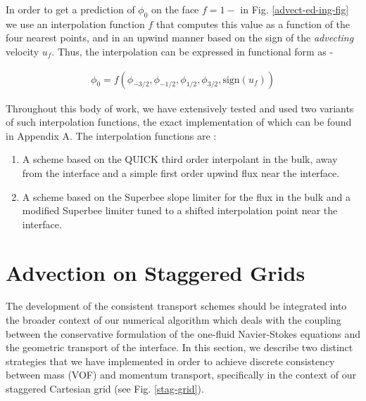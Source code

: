 In order to get a prediction of $\phi_0$ on the 
face $f=1-$ in Fig. \ref{advect-ed-ing-fig}
we use an interpolation function $f$ that computes 
this value as a function of the four nearest points,
and in an upwind manner based on the sign of the 
\textit{advecting} velocity $u_f$. Thus, the interpolation
can be expressed in functional form as - 


\begin{align}
\phi_0 = f \left( \phi_{-3/2}, \phi_{-1/2}, \phi_{1/2},\phi_{3/2},\textrm{sign}(u_f) \right)
\label{simpleinterp}
\end{align}


Throughout this body of work, we have extensively tested and used 
two variants of such interpolation functions, the exact implementation 
of which can be found in Appendix A. The interpolation functions are :



\begin{enumerate}
\item A scheme based on the QUICK 
third order interpolant in the bulk, away from the interface 
and a simple first order upwind flux near the interface. 
\item A scheme based on the Superbee slope limiter  for the flux in the 
bulk and a modified Superbee limiter tuned to a shifted interpolation point near the 
interface.  
\end{enumerate}


\section{Advection on Staggered Grids}

The development of the consistent transport schemes should be integrated into
the broader context of our numerical algorithm which deals with the 
coupling between the conservative formulation of the 
one-fluid Navier-Stokes equations and the geometric transport of the interface.  
In this section, we describe two distinct strategies that we have implemented in order to achieve 
discrete consistency between mass (VOF) and momentum transport, specifically 
in the context of our staggered Cartesian grid (see Fig. \ref{stag-grid}). 


